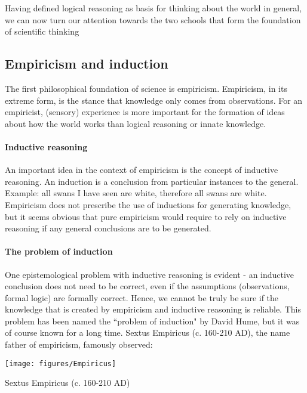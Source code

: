 \documentclass{tufte-book}
\begin{document}
Having defined logical reasoning as basis for thinking about the world in general, we can now turn our attention towards the two schools that form the foundation of scientific thinking


\subsection{Empiricism and induction}

The first philosophical foundation of science is empiricism. Empiricism, in its extreme form, is the stance that knowledge only comes from observations. For an empiricist, (sensory) experience is more important for the formation of ideas about how the world works than logical reasoning or innate knowledge.

\paragraph{Inductive reasoning} An important idea in the context of empiricism is the concept of inductive reasoning. An induction is a conclusion from particular instances to the general. Example: all swans I have seen are white, therefore all swans are white. Empiricism does not prescribe the use of inductions for generating knowledge, but it seems obvious that pure empiricism would require to rely on inductive reasoning if any general conclusions are to be generated.


\paragraph{The problem of induction}One epistemological problem with inductive reasoning is evident - an inductive conclusion does not need to be correct, even if the assumptions (observations, formal logic) are formally correct. Hence, we cannot be truly be sure if the knowledge that is created by empiricism and inductive reasoning is reliable. This problem has been named the ``problem of induction" by David Hume, but it was of course known for a long time. Sextus Empiricus (c. 160-210 AD), the name father of empiricism, famously observed:

\begin{marginfigure}
\begin{center}
\texttt{[image: figures/Empiricus]}
\caption{Sextus Empiricus (c. 160-210 AD)}
\label{fig: Empiricus}
\end{center}
\end{marginfigure}
\end{document}
